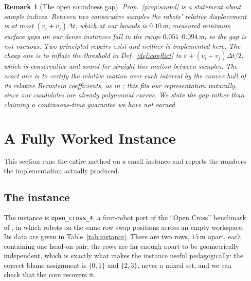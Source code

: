 \documentclass[conference]{IEEEtran}
\newtheorem{remark}{Remark}
\newcommand{\clr}{\varepsilon}
\begin{document}
\begin{remark}[The open soundness gap]
\label{rem:gap}
Prop.~\ref{prop:sound} is a statement about sample indices. Between two consecutive samples
the robots' relative displacement is at most $(v_i + v_j)\Delta t$, which at our bounds is
$0.10$\,m; measured minimum surface gaps on our dense instances fall in the range
$0.051$--$0.094$\,m, so the gap is not vacuous. Two principled repairs exist and neither is
implemented here. The cheap one is to inflate the threshold in Def.~\ref{def:conflict} to
$\clr + (v_i + v_j)\Delta t/2$, which is conservative and sound for straight-line motion
between samples. The exact one is to certify the relative motion over each interval by the
convex hull of its relative Bernstein coefficients, as in \cite{parkkim2020}; this fits our
representation naturally, since our candidates are already polynomial curves. We state the
gap rather than claiming a continuous-time guarantee we have not earned.
\end{remark}

\section{A Fully Worked Instance}
\label{sec:example}

This section runs the entire method on a small instance and reports the numbers the
implementation actually produced.

\subsection{The instance}

The instance is \texttt{open\_cross\_4}, a four-robot port of the ``Open Cross'' benchmark
of \cite{karc2025}, in which robots on the same row swap positions across an empty
workspace. Its data are given in Table~\ref{tab:instance}. There are two rows, $15$\,m
apart, each containing one head-on pair; the rows are far enough apart to be geometrically
independent, which is exactly what makes the instance useful pedagogically: the correct
blame assignment is $\{0,1\}$ and $\{2,3\}$, never a mixed set, and we can check that the
core recovers it.
\end{document}
